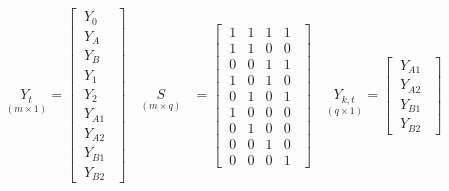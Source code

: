 \documentclass[a4paper,fleqn,11pt]{article}
\begin{document}
\begin{align*}
	\underset{(m\times 1)}{Y_t} = \begin{bmatrix}
		\ Y_0\ \ \\
		\ Y_A\ \ \\
		\ Y_B\ \ \\
		\ Y_1\ \ \\
		\ Y_2\ \ \\
		\ Y_{A1}\ \ \\
		\ Y_{A2}\ \ \\
		\ Y_{B1}\ \ \\
		\ Y_{B2}\ \ 
	\end{bmatrix} \quad \underset{(m\times q)}{S} &=
	\begin{bmatrix}
		\ 1 & 1 & 1 & 1 \ \ \\
		\ 1 & 1 & 0 & 0 \ \ \\
		\ 0 & 0  & 1 & 1\ \ \\
		\ 1 & 0 & 1 & 0 \ \ \\
		\ 0 & 1 & 0 & 1\ \ \\
		\ 1 & 0 & 0 & 0 \ \ \\
		\ 0 & 1 & 0 & 0 \ \ \\
		\ 0 & 0 & 1 & 0 \ \ \\
		\ 0 & 0 & 0 & 1\ \ 
	\end{bmatrix} \quad \underset{(q\times 1)}{Y_{k,t}} = \begin{bmatrix}
		\ Y_{A1}\ \ \\
		\ Y_{A2}\ \ \\
		\ Y_{B1}\ \ \\
		\ Y_{B2}\ \ 
	\end{bmatrix} 
\end{align*}
\end{document}
